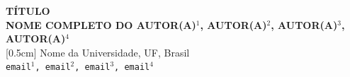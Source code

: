\documentclass[a0,portrait]{a0poster}
\begin{document}
\begin{minipage}[b]{1.0\linewidth} %
\begin{center}
\Huge \textbf{T\'ITULO}\\
\huge \textbf{NOME COMPLETO DO AUTOR(A)$^{1}$, AUTOR(A)$^{2}$, AUTOR(A)$^{3}$, AUTOR(A)$^{4}$}\\
[0.5cm] %
\huge Nome da Universidade, UF, Brasil\\[0.4cm] %
\Large \texttt{email$^{1}$, email$^{2}$, email$^{3}$, email$^{4}$}\\
\end{center}
\end{minipage}
%
\vspace{1cm} %

%


\end{document}
